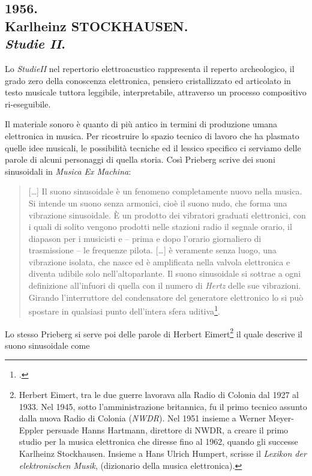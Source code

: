 
\subsection*{1956.\\ Karlheinz STOCKHAUSEN. \\ \emph{Studie II}.}

Lo \emph{StudieII} nel repertorio elettroacustico rappresenta il reperto archeologico, il grado zero della conoscenza elettronica, pensiero cristallizzato ed articolato in testo musicale tuttora leggibile, interpretabile, attraverso un processo compositivo ri-eseguibile.

Il materiale sonoro è quanto di più antico in termini di produzione umana elettronica in musica. Per ricostruire lo spazio tecnico di lavoro che ha plasmato quelle idee musicali, le possibilità tecniche ed il lessico specifico ci serviamo delle parole di alcuni personaggi di quella storia. Così Prieberg scrive dei suoni sinusoidali in \emph{Musica Ex Machina}:

\begin{quote}
	[\ldots] Il suono sinusoidale è un fenomeno completamente nuovo nella musica. Si intende un suono senza armonici, cioè il suono nudo, che forma una vibrazione sinusoidale. È un prodotto dei vibratori graduati elettronici, con i quali di solito vengono prodotti nelle stazioni radio il segnale orario, il diapason per i musicisti e – prima e dopo l’orario giornaliero di trasmissione – le frequenze pilota.
	[\ldots] è veramente senza luogo, una vibrazione isolata, che nasce ed è amplificata nella valvola elettronica e diventa udibile solo nell’altoparlante. Il suono sinusoidale si sottrae a ogni definizione all’infuori di quella con il numero di \emph{Hertz} delle sue vibrazioni. Girando l’interruttore del condensatore del generatore elettronico lo si può spostare in qualsiasi punto dell’intera sfera uditiva\footcite[pag. 170--179]{prieberg:mexm}.
\end{quote}

Lo stesso Prieberg si serve poi delle parole di Herbert Eimert\footnote{
	Herbert Eimert, tra le due guerre lavorava alla Radio di Colonia dal 1927 al 1933. Nel 1945, sotto l'amministrazione britannica, fu il primo tecnico assunto dalla nuova Radio di Colonia (\emph{NWDR}). Nel 1951 insieme a Werner Meyer-Eppler persuade Hanns Hartmann, direttore di NWDR, a creare il primo studio per la musica elettronica che diresse fino al 1962, quando gli successe Karlheinz Stockhausen. Insieme a Hans Ulrich Humpert, scrisse il \emph{Lexikon der elektronischen Musik}, (dizionario della musica elettronica).
} il quale descrive il suono sinusoidale come

